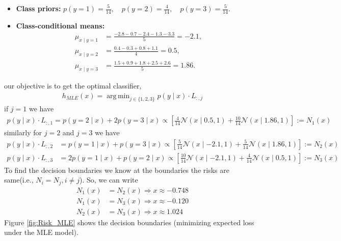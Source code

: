\documentclass[solution,addpoints,12pt]{exam}
\DeclareMathOperator*{\argmin}{arg\,min}
\begin{document}
\begin{questions}
\begin{parts}
\begin{subparts}
\begin{solution}
	\begin{itemize}
		\item \textbf{Class priors:}
		$p(y=1) = \frac{5}{14}, \quad p(y=2) = \frac{4}{14}, \quad p(y=3) = \frac{5}{14}.$
		\item \textbf{Class-conditional means:}
		\begin{align*}
			\mu_{x \mid y=1} &= \frac{-2.8 - 0.7 - 2.4 - 1.3 - 3.3}{5} = -2.1,\\
			\mu_{x \mid y=2} &= \frac{0.4 - 0.3 + 0.8 + 1.1}{4} = 0.5,\\
			\mu_{x \mid y=3} &= \frac{1.5 + 0.9 + 1.8 + 2.5 + 2.6}{5} = 1.86.
		\end{align*}
	\end{itemize}
	our objective is to get the optimal classifier,
	\begin{align*}
		h_{MLE}(x)=\argmin_{j\in\{1,2,3\}} p(y\mid x)\cdot L_{:,j}
	\end{align*}
	if $j=1$ we have
	\begin{align*}
		p(y\mid x)\cdot L_{:,1} =p(y=2\mid x)+2p(y=3\mid x)\propto\left[\frac{4}{14}\mathcal{N}(x\mid 0.5,1)+\frac{10}{14}\mathcal{N}(x\mid 1.86,1)\right]:=N_1(x)
	\end{align*}
	similarly for $j=2 $ and $j=3$ we have
	\begin{align*}
		p(y\mid x)\cdot L_{:,2}& =p(y=1\mid x)+p(y=3\mid x)\propto\left[\frac{5}{14}\mathcal{N}(x\mid -2.1,1)+\frac{5}{14}\mathcal{N}(x\mid 1.86,1)\right]:=N_2(x)\\
		p(y\mid x)\cdot L_{:,3}& =2p(y=1\mid x)+p(y=2\mid x)\propto\left[\frac{10}{14}\mathcal{N}(x\mid -2.1,1)+\frac{4}{14}\mathcal{N}(x\mid 0.5,1)\right]:=N_3(x)
	\end{align*}
	To find the decision boundaries we know at the boundaries the risks are same(i.e., $N_i=N_j,i\neq j $). So, we can write
	\begin{align*}
		N_1(x)&=N_2(x)\Rightarrow x\approx -0.748\\
		N_1(x)&=N_3(x)\Rightarrow x\approx -0.120\\
		N_2(x)&=N_3(x)\Rightarrow x\approx 1.024
	\end{align*}
	Figure \ref{fig:Risk_MLE} shows the decision boundaries (minimizing expected loss under the MLE model).
	\begin{figure}[H]
		\centering
\end{figure}
\end{solution}
\end{subparts}
\end{parts}
\end{questions}
\end{document}
